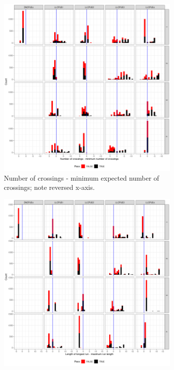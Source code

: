 \begin{figure}
    \begin{subfigure}[a]{0.35\textwidth}
    \includegraphics[width=\linewidth]{figures/run-cross-1.png}
    \caption{Number of crossings - minimum expected number of crossings; note reversed x-axis.}
    \label{fig:runs-cross} 
    \end{subfigure}%
    \begin{subfigure}[b]{0.35\textwidth}
    \includegraphics[width=\linewidth]{figures/run-long-1.png}

\end{subfigure}
\end{figure}
